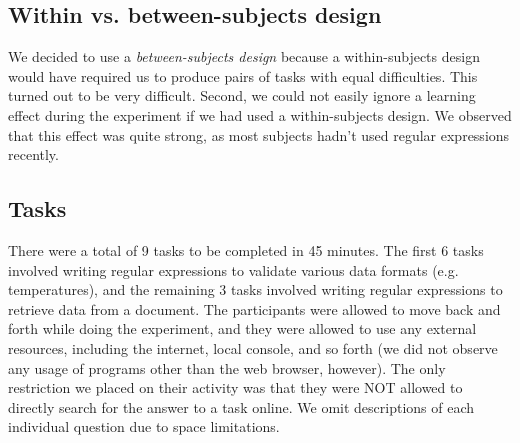 \documentclass[10pt, conference, compsocconf]{IEEEtran}
\begin{document}
\subsection{Within vs. between-subjects design}

We decided to use a \textit{between-subjects design} because a within-subjects design would have required us to produce pairs of tasks with equal difficulties. This turned out to be very difficult. Second, we could not easily ignore a learning effect during the experiment if we had used a within-subjects design. We observed that this effect was quite strong, as most subjects hadn't used regular expressions recently.

\subsection{Tasks}

There were a total of 9 tasks to be completed in 45 minutes. The first 6 tasks involved writing regular expressions to validate various data formats (e.g. temperatures), and the remaining 3 tasks involved writing regular expressions to retrieve data from a document. The participants were allowed to move back and forth while doing the experiment, and they were allowed to use any external resources, including the internet, local console, and so forth (we did not observe any usage of programs other than the web browser, however). The only restriction we placed on their activity was that they were NOT allowed to directly search for the answer to a task online. We omit descriptions of each individual question due to space limitations.
\end{document}
